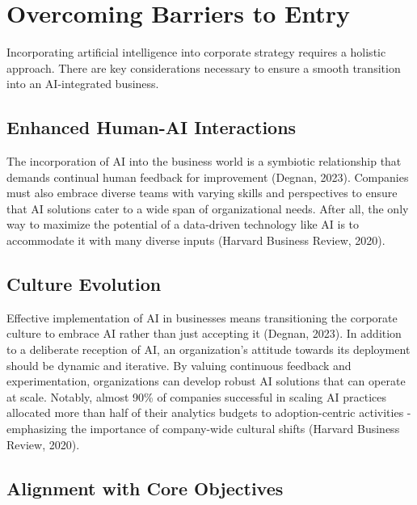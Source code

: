 \documentclass[
]{book}
\begin{document}
\hypertarget{overcoming-barriers-to-entry}{%
\section{Overcoming Barriers to Entry}\label{overcoming-barriers-to-entry}}

Incorporating artificial intelligence into corporate strategy requires a holistic approach. There are key considerations necessary to ensure a smooth transition into an AI-integrated business.

\hypertarget{enhanced-human-ai-interactions}{%
\subsection{Enhanced Human-AI Interactions}\label{enhanced-human-ai-interactions}}

The incorporation of AI into the business world is a symbiotic relationship that demands continual human feedback for improvement (Degnan, 2023). Companies must also embrace diverse teams with varying skills and perspectives to ensure that AI solutions cater to a wide span of organizational needs. After all, the only way to maximize the potential of a data-driven technology like AI is to accommodate it with many diverse inputs (Harvard Business Review, 2020).

\hypertarget{culture-evolution}{%
\subsection{Culture Evolution}\label{culture-evolution}}

Effective implementation of AI in businesses means transitioning the corporate culture to embrace AI rather than just accepting it (Degnan, 2023). In addition to a deliberate reception of AI, an organization's attitude towards its deployment should be dynamic and iterative. By valuing continuous feedback and experimentation, organizations can develop robust AI solutions that can operate at scale. Notably, almost 90\% of companies successful in scaling AI practices allocated more than half of their analytics budgets to adoption-centric activities - emphasizing the importance of company-wide cultural shifts (Harvard Business Review, 2020).

\hypertarget{alignment-with-core-objectives}{%
\subsection{Alignment with Core Objectives}\label{alignment-with-core-objectives}}
\end{document}
